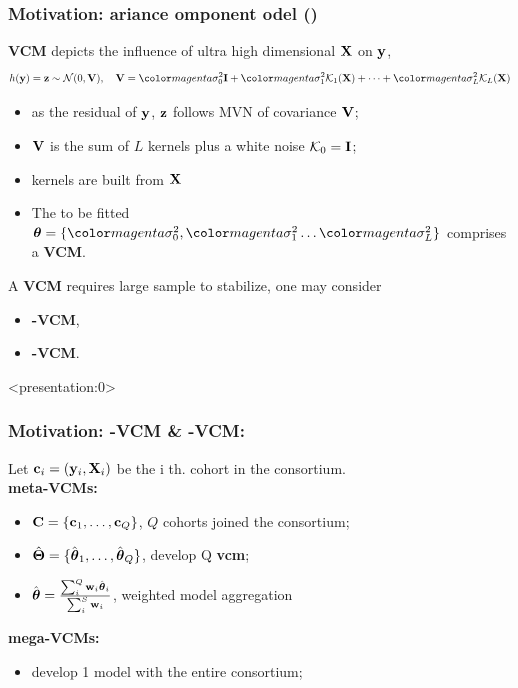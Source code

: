 \documentclass{beamer}
\begin{document}
\begin{frame}
  \frametitle{Motivation: ariance omponent
    odel ()} %
  \textbf{VCM} depicts the influence of ultra high dimensional $\mathbf{X}$
  on $\mathbf{y}$,
  \begin{align}\label{eq:vcm}
    h(\vy) = \vz \sim \mathcal{N}(0, \xv), \quad
    \xv = \fit{\sigma^2_0} \id + \fit{\sigma^2_1} \mck_1(\xx) + \dots + \fit{\sigma^2_L} \mck_L(\xx)
  \end{align}
  \begin{itemize}
  \item as the residual of $\mathbf{y}$, $\mathbf{z}$ follows MVN of covariance
    $\mathbf{V}$;
  \item $\mathbf{V}$ is the sum of $L$ kernels plus a white noise
    $\mathcal{K}_0 = \textbf{I}$;
  \item kernels are built from $\mathbf{X}$
  \item The to be fitted
    $\vtheta = \{\fit{\sigma^2_0}, \fit{\sigma^2_1} \dots
    \fit{\sigma^2_L}\}$ comprises a \textbf{VCM}.
  \end{itemize}
  A \textbf{VCM} requires large sample to stabilize, one may consider
  \begin{itemize}
  \item \textbf{-VCM},
  \item \textbf{-VCM}.
  \end{itemize}
\end{frame}
\begin{frame} <presentation:0> %
  \frametitle{Motivation: \textbf{-VCM \&
      -VCM:}} %
  Let $\mathbf{c}_i=(\mathbf{y}_i, \mathbf{X}_i)$ be the i th. cohort in the consortium. \\
  \textbf{{\color{red}meta}-VCMs:}
  \begin{itemize}
  \item $\mathbf{C} = \{\mathbf{c}_1, \dots, \mathbf{c}_Q \}$, $Q$ cohorts joined the
    consortium;
  \item $\hat{\boldsymbol{\Theta}}=\{\hat{\boldsymbol{\theta}}_1, \dots, \hat{\boldsymbol{\theta}}_Q\}$,
    develop Q \textbf{vcm};
  \item
    $\hat{\boldsymbol{\theta}} = \frac{\sum_i^Q \mathbf{w}_i \hat{\boldsymbol{\theta}}_i}{\sum_i^S
      \mathbf{w}_i}$, weighted model aggregation
  \end{itemize}
  \textbf{{\color{red}mega}-VCMs:}
  \begin{itemize}
  \item develop 1 model with the entire consortium;
  \end{itemize}
\end{frame}
\end{document}
